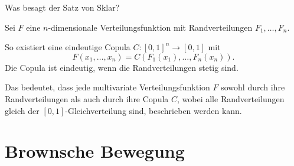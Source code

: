 \begin{QandA}
    \item Was besagt der Satz von Sklar?
    \begin{answered}
        Sei $F$ eine $n$-dimensionale Verteilungsfunktion mit Randverteilungen $F_1, \ldots, F_n$.

        So existiert eine eindeutige Copula $C: [0, 1]^n \to [0, 1]$ mit
        \[
            F(x_1, \ldots, x_n) = C(F_1(x_1), \ldots, F_n(x_n)).
        \]
        Die Copula ist eindeutig, wenn die Randverteilungen stetig sind.

        Das bedeutet, dass jede multivariate Verteilungsfunktion $F$ sowohl durch ihre Randverteilungen als auch durch ihre Copula $C$, wobei alle Randverteilungen gleich der $[0, 1]$-Gleichverteilung sind, beschrieben werden kann.
    \end{answered}
\end{QandA}

\newpage
\section*{Brownsche Bewegung}

